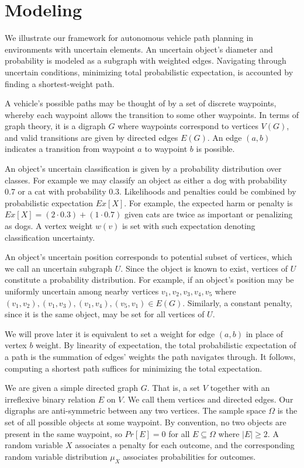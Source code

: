 \documentclass[pdflatex,sn-mathphys-num]{sn-jnl}%
\begin{document}
\section{Modeling} \label{Modeling}

We illustrate our framework for autonomous vehicle path planning in environments with uncertain elements. An uncertain object's diameter and probability is modeled as a subgraph with weighted edges. Navigating through uncertain conditions, minimizing total probabilistic expectation, is accounted by finding a shortest-weight path.

A vehicle's possible paths may be thought of by a set of discrete waypoints, whereby each waypoint allows the transition to some other waypoints. In terms of graph theory, it is a digraph $G$ where waypoints correspond to vertices $V(G)$, and valid transitions are given by directed edges $E(G)$. An edge $(a,b)$ indicates a transition from waypoint $a$ to waypoint $b$ is possible.

An object's uncertain classification is given by a probability distribution over classes. For example we may classify an object as either a dog with probability 0.7 or a cat with probability 0.3. Likelihoods and penalties could be combined by probabilistic expectation $Ex[X]$. For example, the expected harm or penalty is $Ex[X] = (2 \cdot 0.3) + (1 \cdot 0.7)$ given cats are twice as important or penalizing as dogs. A vertex weight $w(v)$ is set with such expectation denoting classification uncertainty.

An object's uncertain position corresponds to potential subset of vertices, which we call an uncertain subgraph $U$. Since the object is known to exist, vertices of $U$ constitute a probability distribution. For example, if an object's position may be uniformly uncertain among nearby vertices $v_1, v_2, v_3, v_4, v_5$ where $(v_1,v_2), (v_1, v_3), (v_1, v_4), (v_5,v_1) \in E(G)$. Similarly, a constant penalty, since it is the same object, may be set for all vertices of $U$.

We will prove later it is equivalent to set a weight for edge $(a,b)$ in place of vertex $b$ weight. By linearity of expectation, the total probabilistic expectation of a path is the summation of edges' weights the path navigates through. It follows, computing a shortest path suffices for minimizing the total expectation.

We are given a simple directed graph $G$. That is, a set $V$ together with an irreflexive binary relation $E$ on $V$. We call them vertices and directed edges. Our digraphs are anti-symmetric between any two vertices. The sample space $\Omega$ is the set of all possible objects at some waypoint. By convention, no two objects are present in the same waypoint, so $Pr[E] = 0$ for all $E \subseteq \Omega$ where $|E| \geq 2$. A random variable $X$ associates a penalty for each outcome, and the corresponding random variable distribution $\mu_X$ associates probabilities for outcomes.
\end{document}
